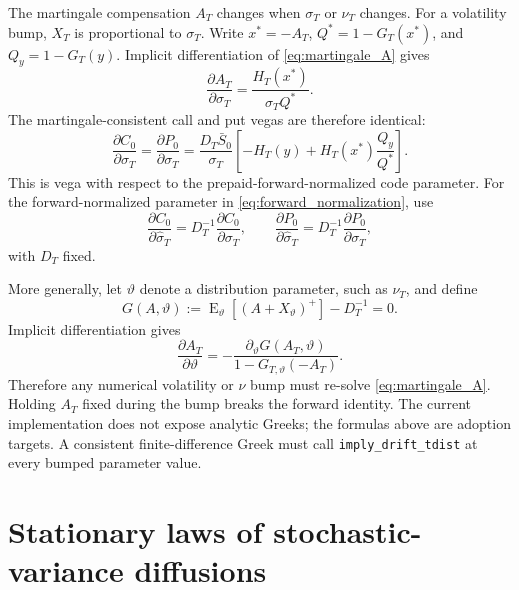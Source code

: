 \documentclass[11pt,a4paper]{article}
\DeclareMathOperator{\E}{E}
\newcommand{\cdf}{G}
\begin{document}
The martingale compensation $A_T$ changes when $\sigma_T$ or $\nu_T$ changes.
For a volatility bump, $X_T$ is proportional to $\sigma_T$.  Write
$x^*=-A_T$, $Q^*=1-\cdf_T(x^*)$, and $Q_y=1-\cdf_T(y)$.  Implicit
differentiation of \eqref{eq:martingale_A} gives
\begin{equation}
  \frac{\partial A_T}{\partial\sigma_T}
  =\frac{H_T(x^*)}{\sigma_TQ^*}.
  \label{eq:drift_vega_adjustment}
\end{equation}
The martingale-consistent call and put vegas are therefore identical:
\begin{equation}
  \boxed{
  \frac{\partial C_0}{\partial\sigma_T}
  =\frac{\partial P_0}{\partial\sigma_T}
  =\frac{D_T\bar S_0}{\sigma_T}
  \left[-H_T(y)+H_T(x^*)\frac{Q_y}{Q^*}\right].
  }
  \label{eq:martingale_consistent_vega}
\end{equation}
This is vega with respect to the prepaid-forward-normalized code parameter.
For the forward-normalized parameter in \eqref{eq:forward_normalization}, use
\begin{equation}
  \frac{\partial C_0}{\partial\widehat\sigma_T}
  =D_T^{-1}\frac{\partial C_0}{\partial\sigma_T},
  \qquad
  \frac{\partial P_0}{\partial\widehat\sigma_T}
  =D_T^{-1}\frac{\partial P_0}{\partial\sigma_T},
  \label{eq:forward_normalized_vega}
\end{equation}
with $D_T$ fixed.

More generally, let $\vartheta$ denote a distribution parameter, such as
$\nu_T$, and define
\begin{equation}
  G(A,\vartheta)
  :=\E_\vartheta[(A+X_\vartheta)^+]-D_T^{-1}=0.
\end{equation}
Implicit differentiation gives
\begin{equation}
  \frac{\partial A_T}{\partial\vartheta}
  =-\frac{\partial_\vartheta G(A_T,\vartheta)}
  {1-\cdf_{T,\vartheta}(-A_T)}.
  \label{eq:implicit_drift_greek}
\end{equation}
Therefore any numerical volatility or $\nu$ bump must re-solve
\eqref{eq:martingale_A}.  Holding $A_T$ fixed during the bump breaks the
forward identity.  The current implementation does not expose analytic Greeks;
the formulas above are adoption targets.  A consistent finite-difference Greek
must call \texttt{imply\_drift\_tdist} at every bumped parameter value.

\section{Stationary laws of stochastic-variance diffusions}
\end{document}
